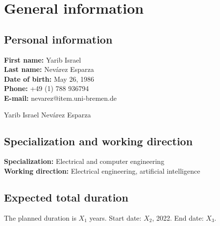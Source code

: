 \section{General information}
\subsection{Personal information}
\textbf{First name:} Yarib Israel\\
\textbf{Last name:} Nev\'arez Esparza\\
\textbf{Date of birth:} May 26, 1986\\
\textbf{Phone:} +49 (1) 788 936794\\
\textbf{E-mail:} nevarez@item.uni-bremen.de\\


\colorbox{signaturegray}{\makebox[0.4\textwidth]{\raisebox{-15mm}{\rule{7cm}{0.1pt}}}}
		
Yarib Israel Nev\'arez Esparza


\subsection{Specialization and working direction}
\textbf{Specialization:} Electrical and computer engineering\\
\textbf{Working direction:} Electrical engineering, artificial intelligence

\subsection{Expected total duration}
The planned duration is $X_{1}$ years. Start date: $X_{2}$, 2022. End date: $X_{3}$.

\pagebreak
